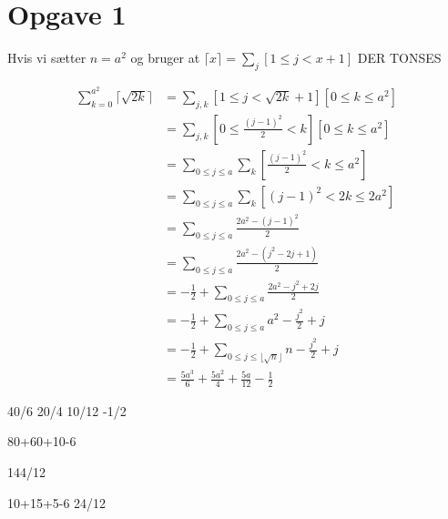 \documentclass[12pt]{article}
\author{Nikolaj Dybdahl Rathcke}
\begin{document}
\section*{Opgave 1}

Hvis vi sætter $n=a^2$ og bruger at $\lceil x\rceil=\sum_j [1\leq j<x+1]$
DER TONSES

\begin{align*}
\sum_{k=0}^{a^2}\lceil\sqrt{2k}\rceil &= \sum_{j,k}\left[1\leq j< \sqrt{2k}+1\right]\left[0\leq k\leq a^2\right] \\
&=\sum_{j,k}\left[0\leq \frac{(j-1)^2}{2}< k\right]\left[0\leq k\leq a^2\right] \\
&=\sum_{0\leq j\leq a}\sum_k \left[\frac{(j-1)^2}{2}< k\leq a^2\right] \\
&=\sum_{0\leq j\leq a}\sum_k \left[(j-1)^2< 2k\leq 2a^2\right] \\
&=\sum_{0\leq j\leq a} \frac{2a^2-(j-1)^2}{2} \\ 
&=\sum_{0\leq j\leq a} \frac{2a^2-(j^2-2j+1)}{2} \\
&=-\frac{1}{2}+\sum_{0\leq j\leq a} \frac{2a^2-j^2+2j}{2} \\
&=-\frac{1}{2}+\sum_{0\leq j\leq a} a^2-\frac{j^2}{2}+j \\
&=-\frac{1}{2}+\sum_{0\leq j\leq \lfloor \sqrt{n}\rfloor} n-\frac{j^2}{2}+j \\
&=\frac{5a^3}{6}+\frac{5a^2}{4}+\frac{5a}{12}-\frac{1}{2}
\end{align*}

40/6
20/4
10/12
-1/2

80+60+10-6

144/12


10+15+5-6
24/12
\end{document}
